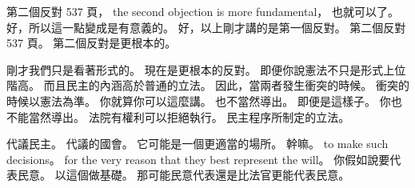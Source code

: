 \hypertarget{w02:cue:2349}{}第二個反對 537 頁，
\hypertarget{w02:cue:2350}{}the second objection is more fundamental，
\hypertarget{w02:cue:2351}{}也就可以了。
\hypertarget{w02:cue:2352}{}好，所以這一點變成是有意義的。
\hypertarget{w02:cue:2353}{}好，以上剛才講的是第一個反對。
\hypertarget{w02:cue:2354}{}第二個反對 537 頁。
\hypertarget{w02:cue:2355}{}第二個反對是更根本的。

\hypertarget{w02:cue:2356}{}剛才我們只是看著形式的。
\hypertarget{w02:cue:2357}{}現在是更根本的反對。
\hypertarget{w02:cue:2358}{}即便你說憲法不只是形式上位階高。
\hypertarget{w02:cue:2359}{}而且民主的內涵高於普通的立法。
\hypertarget{w02:cue:2360}{}因此，當兩者發生衝突的時候。
\hypertarget{w02:cue:2361}{}衝突的時候以憲法為準。
\hypertarget{w02:cue:2362}{}你就算你可以這麼講。
\hypertarget{w02:cue:2363}{}也不當然導出。
\hypertarget{w02:cue:2364}{}即便是這樣子。
\hypertarget{w02:cue:2365}{}你也不能當然導出。
\hypertarget{w02:cue:2366}{}法院有權利可以拒絕執行。
\hypertarget{w02:cue:2367}{}民主程序所制定的立法。

\hypertarget{w02:cue:2368}{}代議民主。
\hypertarget{w02:cue:2369}{}代議的國會。
\hypertarget{w02:cue:2370}{}它可能是一個更適當的場所。
\hypertarget{w02:cue:2371}{}幹嘛。
\hypertarget{w02:cue:2372}{}to make such decisions。
\hypertarget{w02:cue:2373}{}for the very reason that they best represent the will。
\hypertarget{w02:cue:2374}{}你假如說要代表民意。
\hypertarget{w02:cue:2375}{}以這個做基礎。
\hypertarget{w02:cue:2376}{}那可能民意代表還是比法官更能代表民意。

